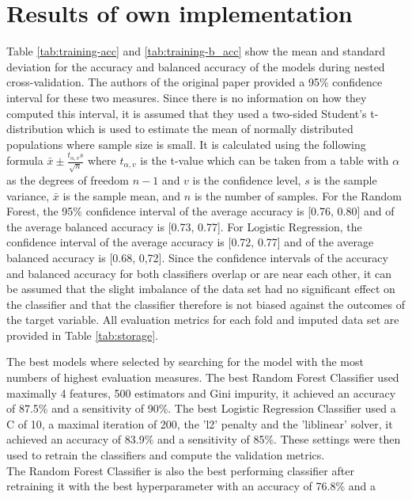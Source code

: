 \section{Results of own implementation}
Table \ref{tab:training-acc} and \ref{tab:training-b_acc} show the mean and 
standard deviation for the accuracy and balanced accuracy of the models during 
nested cross-validation. The authors of the original paper provided a 95\% 
confidence interval for these two measures. Since there is no information on 
how they computed this interval, it is assumed that they used a two-sided 
Student's t-distribution which is used to estimate the mean of normally 
distributed populations where sample size is small. It is calculated using the 
following formula $\bar{x} \pm \frac{t_{\alpha, v}s}{\sqrt{n}}$ where 
$t_{\alpha, v}$ is the t-value which can be taken from a table with $\alpha$ 
as the degrees of freedom $n-1$ and $v$ is the confidence level, $s$ is the 
sample variance, $\bar{x}$ is the sample mean, and $n$ is the number of samples.
For the Random Forest, the 95\% confidence interval of the average accuracy is 
[0.76, 0.80] and of the average balanced accuracy is [0.73, 0.77]. For Logistic 
Regression, the confidence interval of the average accuracy is [0.72, 0.77] and 
of the average balanced accuracy is [0.68, 0,72]. Since the confidence 
intervals of the accuracy and balanced accuracy for both classifiers overlap or 
are near each other, it can be assumed that the slight imbalance of the data 
set had no significant effect on the classifier and that the classifier 
therefore 
is not biased against the outcomes of the target variable. All evaluation 
metrics for each fold and imputed data set are provided in Table 
\ref{tab:storage}.
\par
The best models where selected by searching for the model with the most numbers 
of highest evaluation measures. The best Random Forest Classifier used 
maximally 
4 features, 500 estimators and Gini impurity, it achieved an accuracy of 87.5\% 
and a 
sensitivity of 90\%. The best Logistic Regression Classifier used a C of 10, a 
maximal iteration of 200, the 'l2' penalty and the 'liblinear' solver, it 
achieved an accuracy 
of 83.9\% and a sensitivity of 85\%. These settings were then used to retrain 
the classifiers and compute the validation metrics.
\\
The Random Forest Classifier is also the best performing classifier after 
retraining it with the best hyperparameter with an accuracy of 76.8\% and a 
